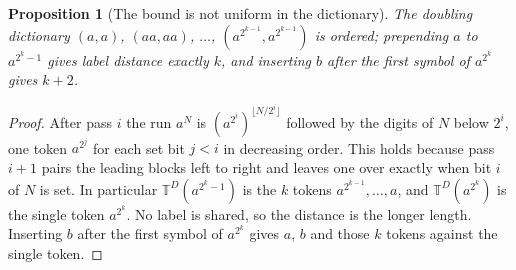 \documentclass[11pt,a4paper]{article}
\theoremstyle{definition}
\theoremstyle{plain}
\newtheorem{proposition}{Proposition}
\newcommand{\T}{\mathbb{T}}
\begin{document}

\begin{proposition}[The bound is not uniform in the dictionary]\label{prop:doubling}
The doubling dictionary \((a,a)\), \((aa,aa)\), \(\dots\), \((a^{2^{k-1}}, a^{2^{k-1}})\) is ordered; prepending \(a\)
to \(a^{2^k - 1}\) gives label distance exactly \(k\), and inserting \(b\) after the first symbol of \(a^{2^k}\) gives
\(k + 2\).
\end{proposition}

\begin{proof}
After pass \(i\) the run \(a^N\) is \((a^{2^i})^{\lfloor N/2^i \rfloor}\) followed by the digits of \(N\) below \(2^i\),
one token \(a^{2^j}\) for each set bit \(j < i\) in decreasing order. This holds because pass \(i+1\) pairs the leading
blocks left to right and leaves one over exactly when bit \(i\) of \(N\) is set. In particular \(\T^D(a^{2^k - 1})\) is
the \(k\) tokens \(a^{2^{k-1}}, \dots, a\), and \(\T^D(a^{2^k})\) is the single token \(a^{2^k}\). No label is shared,
so the distance is the longer length. Inserting \(b\) after the first symbol of \(a^{2^k}\) gives \(a\), \(b\) and those
\(k\) tokens against the single token.
\end{proof}
\end{document}
